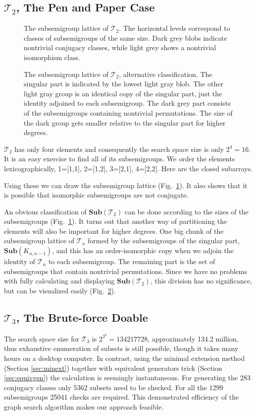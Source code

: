 \documentclass{amsart}
\newcommand{\cT}{{\mathcal T}}
\newcommand{\Sub}{\mathbf{Sub}}
\theoremstyle{plain}
\theoremstyle{definition}
\begin{document}
\subsection{$\cT_2$, The Pen and Paper Case}
\begin{figure}[t]

\caption{The subsemigroup lattice of $\cT_2$. The horizontal levels correspond to classes of subsemigroups of the same size.  Dark grey blobs indicate nontrivial conjugacy classes, while light grey shows a nontrivial isomorphism class.}
\label{fig:T2subs}
\end{figure}
\begin{figure}

\caption{The subsemigroup lattice of $\cT_2$, alternative classification. The singular part is indicated by the lowest light gray blob. The other light gray group is an identical copy of the singular part, just the identity adjoined to each subsemigroup. The dark grey part consists of the subsemigroups containing nontrivial permutations. The size of the dark group gets smaller relative to the singular part for higher degrees.}
\label{fig:T2subsAlt}
\end{figure}
$\cT_2$ has only four elements and consequently the search space size is only $2^4=16$.
It is an easy exercise to find all of its subsemigroups. 
We order the elements lexicographically, 1=[1,1], 2=[1,2], 3=[2,1], 4=[2,2]. Here are the closed subarrays.

Using these we can draw the subsemigroup lattice (Fig.\ \ref{fig:T2subs}).
It also shows that it is possible that isomorphic subsemigroups are not conjugate.

An obvious classification of $\Sub(\cT_2)$ can be done according to the sizes of the subsemigroups (Fig.\ \ref{fig:T2subs}).
It turns out that another way of partitioning the elements will also be important for higher degrees. 
One big chunk of the subsemigroup lattice of $\cT_n$ formed by the subsemigroups of the singular part, $\Sub(K_{n,n-1})$, and this has an order-isomorphic copy when we adjoin the identity of $\cT_n$ to each subsemigroup.
The remaining part is the set of subsemigroups that contain nontrivial permutations. 
Since we have no problems with fully calculating and displaying $\Sub(\cT_2)$, this division has no significance, but can be visualized easily (Fig.\ \ref{fig:T2subsAlt}).

\subsection{$\cT_3$, The Brute-force Doable}
The search space size for $\cT_3$ is $2^{3^3}=134217728$, approximately 134.2 million, thus exhaustive enumeration of subsets is still possible, though it takes many hours on a desktop computer.
In contrast, using the minimal extension method (Section \ref{sec:minext}) together with equivalent generators trick (Section \ref{sec:equivgen}) the calculation is seemingly instantaneous.
For generating the 283 conjugacy classes only 5362 subsets need to be checked. For all the 1299 subsemigroups 25041 checks are required. This demonstrated efficiency of the graph search algorithm makes our approach feasible.
\end{document}

